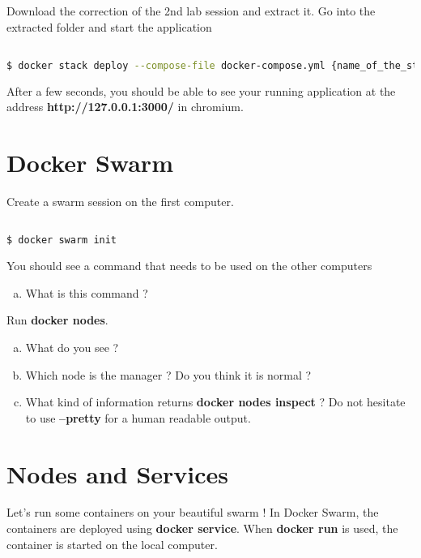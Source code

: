 \documentclass[a4paper,11pt]{exam}
\begin{document}
Download the correction of the 2nd lab session and extract it. Go into 
the extracted folder and start the application

\begin{lstlisting}[frame=single,language={sh}]  % Start your code-block

$ docker stack deploy --compose-file docker-compose.yml {name_of_the_stack}
\end{lstlisting}

After a few seconds, you should be able to see your running application at the address \textbf{http://127.0.0.1:3000/} in chromium.

\section{Docker Swarm}

Create a swarm session on the first computer.

\begin{lstlisting}[frame=single,language={sh}]  % Start your code-block

$ docker swarm init

\end{lstlisting}

\begin{questions}
	\question You should see a command that needs to be used on the other computers
	\begin{enumerate}[(a)]
		\item What is this command ?
	\end{enumerate}
Run \textbf{docker nodes}.
	\begin{enumerate}[(b)]
		\item What do you see ?
		\item Which node is the manager ? Do you think it is normal ?
		\item What kind of information returns \textbf{docker nodes inspect} ? Do not hesitate to use \textbf{--pretty} for a human readable output.
	\end{enumerate}
\end{questions}

\section{Nodes and Services}

Let's run some containers on your beautiful swarm ! In Docker Swarm, 
the containers are deployed using \textbf{docker service}. 
When \textbf{docker run} is used, the container is started 
on the local computer.
\end{document}
